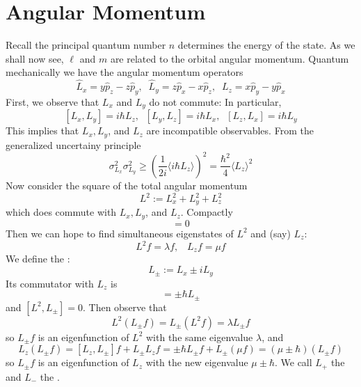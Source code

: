 \documentclass[12pt, a4paper, oneside, openright, titlepage]{book}
\begin{document}
\section{Angular Momentum}

Recall the principal quantum number $n$ determines the energy of the state. As we shall now see, $\ell$ and $m$ are related to the orbital angular momentum. Quantum mechanically we have the angular momentum operators \begin{equation*}
    \hat{L}_x = y\hat{p}_z - z\hat{p}_y,\;\;\hat{L}_y=z\hat{p}_x - x\hat{p}_z,\;\;L_z=x\hat{p}_y - y\hat{p}_x
\end{equation*}
First, we observe that $L_x$ and $L_y$ do not commute: In particular, \begin{equation*}
    \boxed{[L_x,L_y] = i\hbar L_z,\;\;[L_y,L_z] = i\hbar L_x,\;\;[L_z,L_x] = i\hbar L_y}
\end{equation*}
This implies that $L_x,L_y$, and $L_z$ are incompatible observables. From the generalized uncertainy principle \begin{equation*}
    \sigma_{L_x}^2\sigma_{L_y}^2 \geq \left(\frac{1}{2i}\langle i\hbar L_z\rangle\right)^2 = \frac{\hbar^2}{4}\langle L_z\rangle^2
\end{equation*}
Now consider the square of the total angular momentum \begin{equation*}
    L^2 := L_x^2+L_y^2+L_z^2
\end{equation*}
which does commute with $L_x,L_y$, and $L_z$. Compactly \begin{equation*}
    [L^2,L] = 0
\end{equation*}
Then we can hope to find simultaneous eigenstates of $L^2$ and (say) $L_z$: \begin{equation*}
    L^2f = \lambda f ,\;\;\;L_z f = \mu f
\end{equation*}
We define the : \begin{equation*}
    L_{\pm} := L_x \pm iL_y
\end{equation*}
Its commutator with $L_z$ is \begin{equation*}
    [L_z,L_{\pm}] = \pm\hbar L_{\pm}
\end{equation*}
and $[L^2,L_{\pm}] = 0$. Then observe that \begin{equation*}
    L^2(L_{\pm}f) = L_{\pm}(L^2f) = \lambda L_{\pm}f
\end{equation*}
so $L_{\pm}f$ is an eigenfunction of $L^2$ with the same eigenvalue $\lambda$, and \begin{equation*}
    L_z(L_{\pm}f) = [L_z,L_{\pm}]f + L_{\pm}L_zf = \pm\hbar L_{\pm}f + L_{\pm}(\mu f) = (\mu \pm \hbar)(L_{\pm}f)
\end{equation*}
so $L_{\pm}f$ is an eigenfunction of $L_z$ with the new eigenvalue $\mu\pm\hbar$. We call $L_+$ the  and $L_-$ the .
\end{document}
